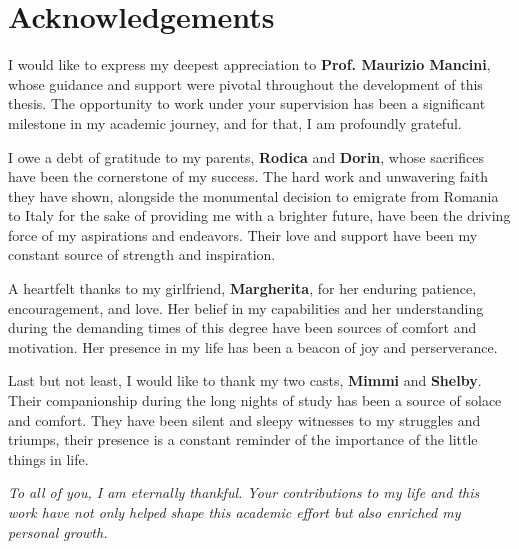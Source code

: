 %
%
\chapter*{Acknowledgements}

    I would like to express my deepest appreciation to \textbf{Prof. Maurizio Mancini}, whose guidance
    and support were pivotal throughout the development of this thesis. The opportunity to work under 
    your supervision has been a significant milestone in my academic journey, and for that, I am
    profoundly grateful.  
   
    \vspace{2mm} 
    
    \noindent I owe a debt of gratitude to my parents, \textbf{Rodica} and \textbf{Dorin}, whose 
    sacrifices have been the cornerstone of my success. The hard work and unwavering faith they have
    shown, alongside the monumental decision to emigrate from Romania to Italy for the sake of 
    providing me with a brighter future, have been the driving force of my aspirations and endeavors. 
    Their love and support have been my constant source of strength and inspiration.
    
    \vspace{2mm}

    \noindent A heartfelt thanks to my girlfriend, \textbf{Margherita}, for her enduring patience, 
    encouragement, and love. Her belief in my capabilities and her understanding during the demanding 
    times of this degree have been sources of comfort and motivation. Her presence in my life has been
    a beacon of joy and perserverance.

    \vspace{2mm}
  
    \noindent Last but not least, I would like to thank my two casts, \textbf{Mimmi} and
    \textbf{Shelby}. Their companionship during the long nights of study has been a source of solace and
    comfort. They have been silent and sleepy witnesses to my struggles and triumps, their presence 
    is a constant reminder of the importance of the little things in life.

    \vspace{2mm}

    \textit{To all of you, I am eternally thankful. Your contributions to my life and this work have
    not only helped shape this academic effort but also enriched my personal growth.}